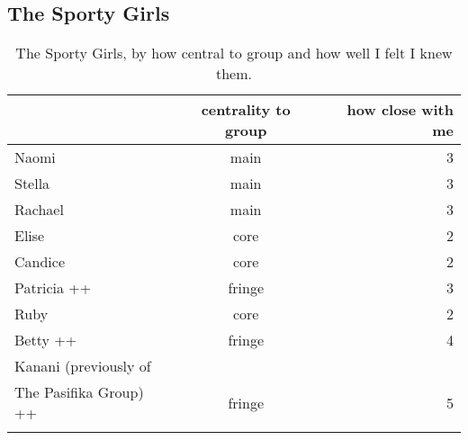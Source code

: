 \subsection{The Sporty Girls}
\nopagebreak
\begin{table}[ht]
\caption{The Sporty Girls, by how central to group and how well I felt I knew them.}\label{append:Sporty}
	\centering
		\begin{tabular}{p{4cm}cr} \\
		\lsptoprule
		\multirow{2}{*}{\sc name} & \multicolumn{1}{p{2cm}}{\centering \sc centrality to group} & \multicolumn{1}{p{1.75cm}}{\centering \sc how close with me} \\
			\midrule
Naomi   & main & 3 \\\hline
Stella  & main & 3 \\\hline
Rachael & main & 3 \\\hline
Elise   & core & 2 \\\hline
Candice & core & 2 \\\hline
Patricia ++ & fringe & 3 \\\hline
Ruby    & core &  2 \\\hline
Betty  ++  & fringe & 4 \\\hline
Kanani (previously of\\The Pasifika Group) ++  & fringe & 5 \\
   \lspbottomrule
		\end{tabular}
\end{table}

\pagebreak

